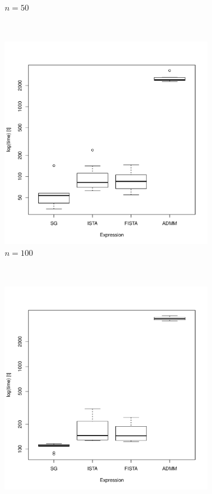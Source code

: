 \documentclass[12pt, leqno]{article}
\theoremstyle{remark}
\begin{document}
\begin{figure}[H]
\begin{subfigure}[b]{0.4\textwidth}
        \caption{$n=50$}
        \label{fig:50}
    \end{subfigure}
\\
    \begin{subfigure}[b]{0.4\textwidth}
        \includegraphics[width=\textwidth]{100timing-cn.pdf}
        \caption{$n=100$}
        \label{fig:100}
    \end{subfigure}
~
    \begin{subfigure}[b]{0.4\textwidth}
        \includegraphics[width=\textwidth]{500timing-cn.pdf}

\end{subfigure}
\end{figure}
\end{document}
